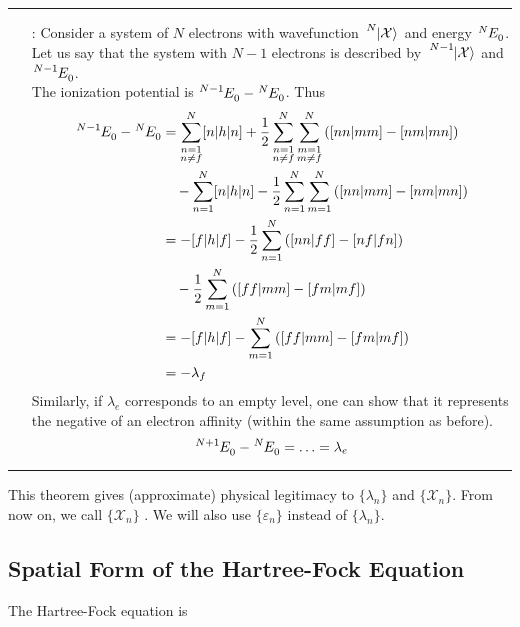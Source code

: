 \documentclass[12pt,a4paper,titlepage]{article}
\newcommand{\aside}[2]{ %
	\bigskip
	{\color{gray}\hrule}
	\bigskip
	\begin{itemize}[align=left,labelindent=0em,labelwidth=3em,labelsep*=0.5em,leftmargin=!]
		\item[\ul{#1}:]{#2}
	\end{itemize}
	\bigskip
	{\color{gray}\hrule}
	\bigskip
}
\newcommand{\ul}[1]{\underline{\smash{#1}}} %
\newcommand{\Chi}{\mathcal{X}} %
\begin{document}
\aside{Proof}{Consider a system of $N$ electrons with wavefunction $\tensor*[^{N}]{\ket{\Chi}}{}$ and energy $\tensor*[^{N}]{E}{_{0}}$. Let us say that the system with $N-1$ electrons is described by $\tensor*[^{N-1}]{\ket{\Chi}}{}$ and $\tensor*[^{N-1}]{E}{_{0}}$.\\

The ionization potential is $\tensor*[^{N-1}]{E}{_{0}}-\tensor*[^{N}]{E}{_{0}}$. Thus
\begin{equation}
\begin{aligned}
\tensor*[^{N-1}]{E}{_{0}}-\tensor*[^{N}]{E}{_{0}}&=\sum_{\substack{n=1\\n\neq f}}^{N}[n|h|n]+\frac{1}{2}\sum_{\substack{n=1 \\ n\neq f}}^{N}\sum_{\substack{m=1 \\ m\neq f}}^{N}\qty([nn|mm]-[nm|mn])\\
&\quad-\sum_{n=1}^{N}[n|h|n]-\frac{1}{2}\sum_{n=1}^{N}\sum_{m=1}^{N}\qty([nn|mm]-[nm|mn])\\
&=-[f|h|f]-\frac{1}{2}\sum_{n=1}^{N}\qty([nn|ff]-[nf|fn])\\
&\quad-\frac{1}{2}\sum_{m=1}^{N}\qty([ff|mm]-[fm|mf])\\
&=-[f|h|f]-\sum_{m=1}^{N}\qty([ff|mm]-[fm|mf])\\
&=-\lambda_{f}
\end{aligned}
\end{equation}
Similarly, if $\lambda_{e}$ corresponds to an empty level, one can show that it represents the negative of an electron affinity (within the same assumption as before).
\begin{equation}
\tensor*[^{N+1}]{E}{_{0}}-\tensor*[^{N}]{E}{_{0}}=\ldots=\lambda_{e}
\end{equation}
}
This theorem gives (approximate) physical legitimacy to $\{\lambda_{n}\}$ and $\{\Chi_{n}\}$. From now on, we call $\{\Chi_{n}\}$ \ul{spin orbitals}.  We will also use $\{\varepsilon_{n}\}$ instead of $\{\lambda_{n}\}$.

\subsection{Spatial Form of the Hartree-Fock Equation}
The Hartree-Fock equation is
\end{document}

